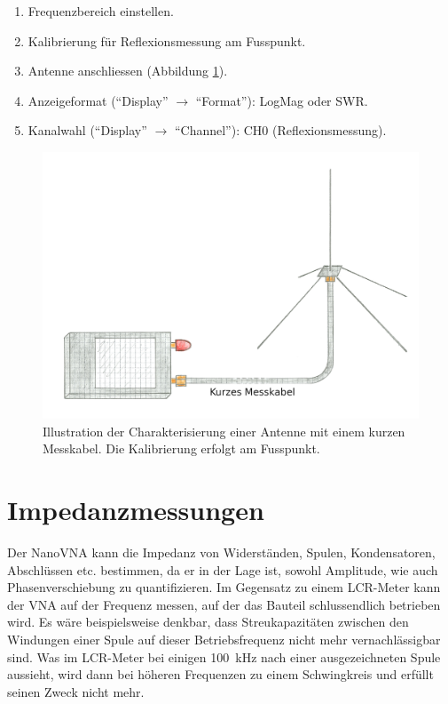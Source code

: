 \documentclass[twoside,a4paper,11pt,halfparskip,DIV=11,notitlepage]{scrartcl}
\begin{document}
\begin{enumerate}
    \item Frequenzbereich einstellen.
    \item Kalibrierung für Reflexionsmessung am Fusspunkt.
    \item Antenne anschliessen (Abbildung \ref{fig:antennenmessung}).
    \item Anzeigeformat (``Display'' $\longrightarrow$ ``Format''): LogMag oder SWR.
    \item Kanalwahl (``Display'' $\longrightarrow$ ``Channel''): CH0 (Reflexionsmessung).
\end{enumerate}

\begin{figure}[H]
    \includegraphics[width=\textwidth]{figures/illustration_antenna.png}
    \caption{Illustration der Charakterisierung einer Antenne mit einem kurzen Messkabel. Die Kalibrierung erfolgt am Fusspunkt.}
    \label{fig:antennenmessung}
\end{figure}

\newpage %
\section{Impedanzmessungen}\label{sec:impedance}
Der NanoVNA kann die Impedanz von Widerständen, Spulen, Kondensatoren, Abschlüssen etc.
bestimmen, da er in der Lage ist, sowohl Amplitude, wie auch Phasenverschiebung zu
quantifizieren. Im Gegensatz zu einem LCR-Meter kann der VNA auf der Frequenz messen,
auf der das Bauteil schlussendlich betrieben wird. Es wäre beispielsweise denkbar,
dass Streukapazitäten zwischen den Windungen einer Spule auf dieser Betriebsfrequenz
nicht mehr vernachlässigbar sind. Was im LCR-Meter bei einigen 100~kHz nach einer
ausgezeichneten Spule aussieht, wird dann bei höheren Frequenzen zu einem Schwingkreis
und erfüllt seinen Zweck nicht mehr.
\end{document}
